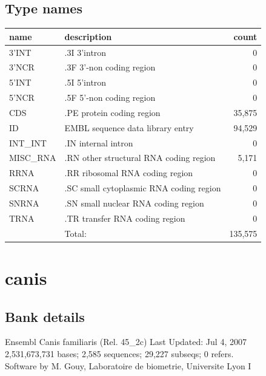 \documentclass{article}
\begin{document}
\begin{Schunk}
\subsection{Type names}
\noindent\begin{tabular}{llr}
\hline \hline
name & description & count \\
\hline
3'INT  &  .3I 3'intron  &  0 \\
3'NCR  &  .3F  3'-non coding region  &  0 \\
5'INT  &  .5I 5'intron  &  0 \\
5'NCR  &  .5F  5'-non coding region  &  0 \\
CDS  &  .PE protein coding region  &  35,875 \\
ID  &  EMBL sequence data library entry  &  94,529 \\
INT\_INT  &  .IN  internal intron  &  0 \\
MISC\_RNA  &  .RN other structural RNA coding region  &  5,171 \\
RRNA  &  .RR ribosomal RNA coding region  &  0 \\
SCRNA  &  .SC small cytoplasmic RNA coding region  &  0 \\
SNRNA  &  .SN small nuclear RNA coding region  &  0 \\
TRNA  &  .TR transfer RNA coding region  &  0 \\
\hline
 & Total: & 135,575 \\
\hline \hline
\end{tabular}

\section{ canis }
\subsection{Bank details}
Ensembl Canis familiaris  (Rel. 45\_2c) Last Updated: Jul  4, 2007\\
2,531,673,731 bases; 2,585 sequences; 29,227 subseqs; 0 refers.\\
Software by M. Gouy, Laboratoire de biometrie, Universite Lyon I


\end{Schunk}
\end{document}
